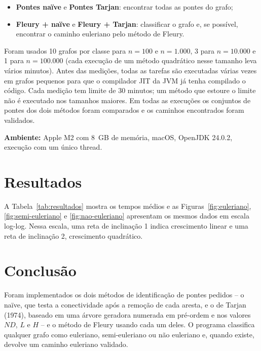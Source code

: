 \documentclass[a4paper,11pt]{article}
\begin{document}
\begin{itemize}
  \item \textbf{Pontes naïve} e \textbf{Pontes Tarjan}: encontrar todas as pontes do grafo;
  \item \textbf{Fleury + naïve} e \textbf{Fleury + Tarjan}: classificar o grafo e, se possível,
        encontrar o caminho euleriano pelo método de Fleury.
\end{itemize}

Foram usados 10 grafos por classe para $n=100$ e $n=1.000$, 3 para $n=10.000$ e 1 para $n=100.000$
(cada execução de um método quadrático nesse tamanho leva vários minutos). Antes das medições, todas as
tarefas são executadas várias vezes em grafos pequenos para que o compilador JIT da JVM já tenha
compilado o código. Cada medição tem limite de 30 minutos; um método que estoure o limite não é
executado nos tamanhos maiores. Em todas as execuções os conjuntos de pontes dos dois métodos foram
comparados e os caminhos encontrados foram validados.

\textbf{Ambiente:} Apple M2 com 8~GB de memória, macOS, OpenJDK 24.0.2, execução com um único thread.

\section{Resultados}

A Tabela~\ref{tab:resultados} mostra os tempos médios e as
Figuras~\ref{fig:euleriano}, \ref{fig:semi-euleriano} e \ref{fig:nao-euleriano} apresentam os mesmos
dados em escala log-log. Nessa escala, uma reta de inclinação 1 indica crescimento linear e uma reta
de inclinação 2, crescimento quadrático.





\section{Conclusão}

Foram implementados os dois métodos de identificação de pontes pedidos -- o naïve, que testa a
conectividade após a remoção de cada aresta, e o de Tarjan (1974), baseado em uma árvore geradora
numerada em pré-ordem e nos valores $ND$, $L$ e $H$ -- e o método de Fleury usando cada um deles.
O programa classifica qualquer grafo como euleriano, semi-euleriano ou não euleriano e, quando existe,
devolve um caminho euleriano validado.
\end{document}
